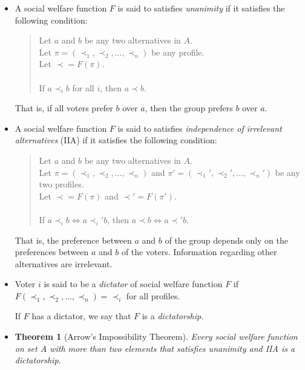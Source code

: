 \documentclass[10pt]{article}
\newtheorem{theorem}[lemma]{Theorem}
\begin{document}
		\begin{itemize}
			
			\item A social welfare function $F$ is said to satisfies \emph{unanimity} if it
			satisfies the following condition:
			
			\begin{quote}
				Let $a$ and $b$ be any two alternatives in $A$. \\
				Let $\pi = (\prec_1, \prec_2, \dotsc, \prec_n)$ be any profile. \\
				Let $\prec = F(\pi).$ \\
				\\
				If $a \prec_i b$ for all $i$, then $a \prec b$.
			\end{quote}
			
			That is, if all voters prefer $b$ over $a$, then the group prefers $b$ over $a$.
			
			\item A social welfare function $F$ is said to satisfies \emph{independence of irrelevant alternatives} (IIA)
			if it satisfies the following condition:
			
			\begin{quote}
				Let $a$ and $b$ be any two alternatives in $A.$ \\
				Let $\pi = (\prec_1, \prec_2, \dotsc, \prec_n)$ and $\pi' = (\prec_1', \prec_2', \dotsc, \prec_n')$ be any two profiles. \\
				Let $\prec = F(\pi)$ and $\prec' = F(\pi').$ \\
				\\
				If $a \prec_i b \iff a \prec_i' b$, then $a \prec b \iff a \prec' b.$
			\end{quote}
			
			That is, the preference between $a$ and $b$ of the group depends only on the preferences between $a$ and $b$ of
			the voters. Information regarding other alternatives are irrelevant.
			
			\item Voter $i$ is said to be a \emph{dictator} of social welfare function $F$
			if $F(\prec_1, \prec_2, \dotsc, \prec_n) = \prec_i$ for all profiles.
			
			If $F$ has a dictator, we say that $F$ is a \emph{dictatorship}.
			
			\item 
			\begin{theorem}[Arrow's Impossibility Theorem]
				Every social welfare function on set $A$ with more than two elements that satisfies unanimity and
				IIA is a dictatorship.
			\end{theorem}
			

\end{itemize}
\end{document}
